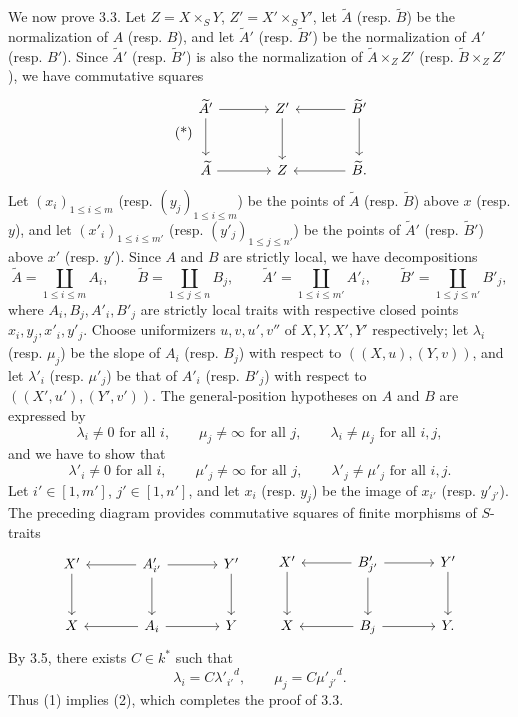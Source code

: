\documentclass[11pt]{article}
\begin{document}
We now prove 3.3. Let $Z=X\times_SY$, $Z'=X'\times_SY'$, let $\widetilde A$ (resp. $\widetilde B$) be the normalization of $A$ (resp. $B$), and let $\widetilde A'$ (resp. $\widetilde B'$) be the normalization of $A'$ (resp. $B'$). Since $\widetilde A'$ (resp. $\widetilde B'$) is also the normalization of $\widetilde A\times_ZZ'$ (resp. $\widetilde B\times_ZZ'$), we have commutative squares
\begin{equation}\tag{*}
\begin{tikzcd}[column sep=large,row sep=large]
\widetilde A' \arrow[r] \arrow[d] & Z' \arrow[d] & \widetilde B' \arrow[l] \arrow[d]\\
\widetilde A \arrow[r] & Z & \widetilde B . \arrow[l]
\end{tikzcd}
\end{equation}
Let $(x_i)_{1\le i\le m}$ (resp. $(y_j)_{1\le i\le m}$) be the points of $\widetilde A$ (resp. $\widetilde B$) above $x$ (resp. $y$), and let $(x'_i)_{1\le i\le m'}$ (resp. $(y'_j)_{1\le j\le n'}$) be the points of $\widetilde A'$ (resp. $\widetilde B'$) above $x'$ (resp. $y'$). Since $A$ and $B$ are strictly local, we have decompositions
\[
\widetilde A=\coprod_{1\le i\le m}A_i,\qquad
\widetilde B=\coprod_{1\le j\le n}B_j,\qquad
\widetilde A'=\coprod_{1\le i\le m'}A'_i,\qquad
\widetilde B'=\coprod_{1\le j\le n'}B'_j,
\]
where $A_i,B_j,A'_i,B'_j$ are strictly local traits with respective closed points $x_i,y_j,x'_i,y'_j$. Choose uniformizers $u,v,u',v''$ of $X,Y,X',Y'$ respectively; let $\lambda_i$ (resp. $\mu_j$) be the slope of $A_i$ (resp. $B_j$) with respect to $((X,u),(Y,v))$, and let $\lambda'_i$ (resp. $\mu'_j$) be that of $A'_i$ (resp. $B'_j$) with respect to $((X',u'),(Y',v'))$. The general-position hypotheses on $A$ and $B$ are expressed by
\begin{equation}
\lambda_i\ne0\text{ for all }i,\qquad
\mu_j\ne\infty\text{ for all }j,\qquad
\lambda_i\ne\mu_j\text{ for all }i,j,
\tag{1}
\end{equation}
and we have to show that
\begin{equation}
\lambda'_i\ne0\text{ for all }i,\qquad
\mu'_j\ne\infty\text{ for all }j,\qquad
\lambda'_j\ne\mu'_j\text{ for all }i,j.
\tag{2}
\end{equation}
Let $i'\in[1,m']$, $j'\in[1,n']$, and let $x_i$ (resp. $y_j$) be the image of $x_{i'}$ (resp. $y'_{j'}$). The preceding diagram provides commutative squares of finite morphisms of $S$-traits
\[
\begin{tikzcd}[column sep=large,row sep=large]
X' \arrow[d] & A'_{i'} \arrow[l] \arrow[r] \arrow[d] & Y' \arrow[d]\\
X & A_i \arrow[l] \arrow[r] & Y
\end{tikzcd}
\qquad
\begin{tikzcd}[column sep=large,row sep=large]
X' \arrow[d] & B'_{j'} \arrow[l] \arrow[r] \arrow[d] & Y' \arrow[d]\\
X & B_j \arrow[l] \arrow[r] & Y .
\end{tikzcd}
\]
By 3.5, there exists $C\in k^*$ such that
\[
\lambda_i=C{\lambda'_{i'}}^d,\qquad
\mu_j=C{\mu'_{j'}}^d.
\]
Thus (1) implies (2), which completes the proof of 3.3.
\end{document}

